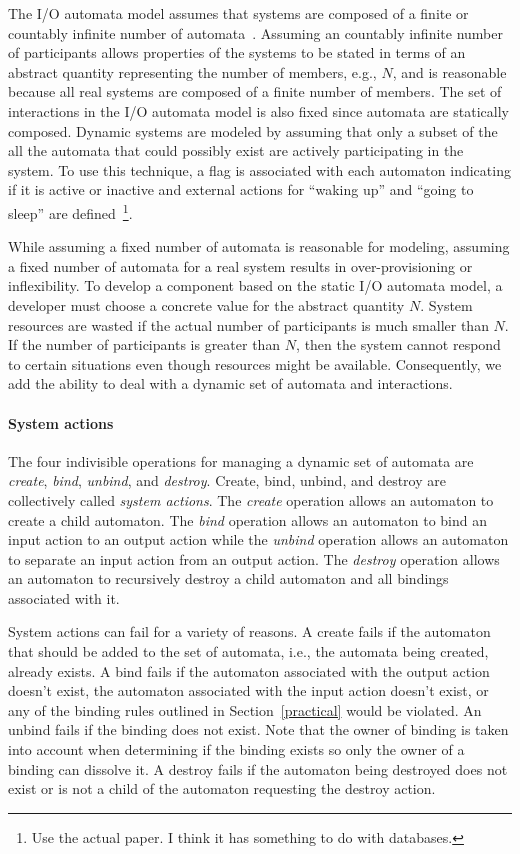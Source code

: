 The I/O automata model assumes that systems are composed of a finite or countably infinite number of automata~\cite{lynch1996distributed}.
Assuming an countably infinite number of participants allows properties of the systems to be stated in terms of an abstract quantity representing the number of members, e.g., $N$, and is reasonable because all real systems are composed of a finite number of members.
The set of interactions in the I/O automata model is also fixed since automata are statically composed.
Dynamic systems are modeled by assuming that only a subset of the all the automata that could possibly exist are actively participating in the system.
To use this technique, a flag is associated with each automaton indicating if it is active or inactive and external actions for ``waking up'' and ``going to sleep'' are defined~\cite{lynch1996distributed}\footnote{Use the actual paper.  I think it has something to do with databases.}.

While assuming a fixed number of automata is reasonable for modeling, assuming a fixed number of automata for a real system results in over-provisioning or inflexibility.
To develop a component based on the static I/O automata model, a developer must choose a concrete value for the abstract quantity $N$.
System resources are wasted if the actual number of participants is much smaller than $N$.
If the number of participants is greater than $N$, then the system cannot respond to certain situations even though resources might be available.
Consequently, we add the ability to deal with a dynamic set of automata and interactions.

\paragraph*{System actions}
The four indivisible operations for managing a dynamic set of automata are \emph{create}, \emph{bind}, \emph{unbind}, and \emph{destroy}.
Create, bind, unbind, and destroy are collectively called \emph{system actions}.
The \emph{create} operation allows an automaton to create a child automaton.
The \emph{bind} operation allows an automaton to bind an input action to an output action while the \emph{unbind} operation allows an automaton to separate an input action from an output action.
The \emph{destroy} operation allows an automaton to recursively destroy a child automaton and all bindings associated with it.

System actions can fail for a variety of reasons.
A create fails if the automaton that should be added to the set of automata, i.e., the automata being created, already exists.
A bind fails if the automaton associated with the output action doesn't exist, the automaton associated with the input action doesn't exist, or any of the binding rules outlined in Section~\ref{practical} would be violated.
An unbind fails if the binding does not exist.
Note that the owner of binding is taken into account when determining if the binding exists so only the owner of a binding can dissolve it.
A destroy fails if the automaton being destroyed does not exist or is not a child of the automaton requesting the destroy action.

